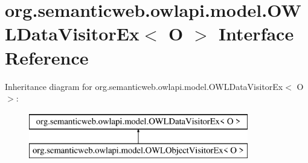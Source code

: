 \hypertarget{interfaceorg_1_1semanticweb_1_1owlapi_1_1model_1_1_o_w_l_data_visitor_ex_3_01_o_01_4}{\section{org.\-semanticweb.\-owlapi.\-model.\-O\-W\-L\-Data\-Visitor\-Ex$<$ O $>$ Interface Reference}
\label{interfaceorg_1_1semanticweb_1_1owlapi_1_1model_1_1_o_w_l_data_visitor_ex_3_01_o_01_4}
}
Inheritance diagram for org.\-semanticweb.\-owlapi.\-model.\-O\-W\-L\-Data\-Visitor\-Ex$<$ O $>$\-:\begin{figure}[H]
\begin{center}
\leavevmode
\includegraphics[height=2.000000cm]{interfaceorg_1_1semanticweb_1_1owlapi_1_1model_1_1_o_w_l_data_visitor_ex_3_01_o_01_4}
\end{center}
\end{figure}
